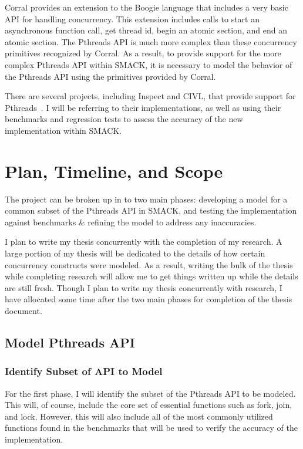 \documentclass{scrartcl}
\begin{document}
Corral provides an extension to the Boogie language that includes a very basic API for handling concurrency.  This extension includes calls to start an asynchronous function call, get thread id, begin an atomic section, and end an atomic section.  The Pthreads API is much more complex than these concurrency primitives recognized by Corral.  As a result, to provide support for the more complex Pthreads API within SMACK, it is necessary to model the behavior of the Pthreads API using the primitives provided by Corral.

There are several projects, including Inspect and CIVL, that provide support for Pthreads~\cite{civl}\cite{inspect}.  I will be referring to their implementations, as well as using their benchmarks and regression tests to assess the accuracy of the new implementation within SMACK.


\section{Plan, Timeline, and Scope}
The project can be broken up in to two main phases: developing a model for a common subset of the Pthreads API in SMACK, and testing the implementation against benchmarks \& refining the model to address any inaccuracies.

I plan to write my thesis concurrently with the completion of my research.   A large portion of my thesis will be dedicated to the details of how certain concurrency constructs were modeled.  As a result, writing the bulk of the thesis while completing research will allow me to get things written up while the details are still fresh.  Though I plan to write my thesis concurrently with research, I have allocated some time after the two main phases for completion of the thesis document.

\subsection{Model Pthreads API}

\subsubsection{Identify Subset of API to Model} 

For the first phase,  I will identify the subset of the Pthreads API to be modeled.  This will, of course, include the core set of essential functions such as fork, join, and lock.  However, this will also include all of the most commonly utilized functions found in the benchmarks that will be used to verify the accuracy of the implementation.  
\end{document}
